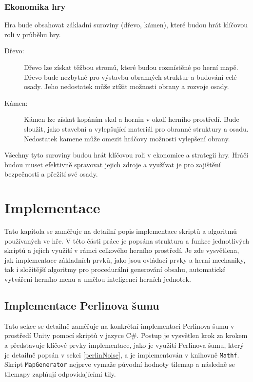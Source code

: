 \subsection{Ekonomika hry}
Hra bude obsahovat základní suroviny (dřevo, kámen), které budou hrát klíčovou roli v průběhu hry.

\begin{description}
	\item[Dřevo:] Dřevo lze získat těžbou stromů, které budou rozmístěné po herní mapě. Dřevo bude nezbytné pro výstavbu obranných struktur a budování celé osady. Jeho nedostatek může ztížit možnosti obrany a rozvoje osady.
	\item[Kámen:] Kámen lze získat kopáním skal a hornin v okolí herního prostředí. Bude sloužit, jako stavební a vylepšující materiál pro obranné struktury a osadu. Nedostatek kamene může omezit hráčovy možnosti vylepšení obrany.
\end{description}

Všechny tyto suroviny budou hrát klíčovou roli v ekonomice a strategii hry. Hráči budou muset efektivně spravovat jejich zdroje a využívat je pro zajištění bezpečnosti a přežití své osady.

\chapter{Implementace}
\label{implementace}
Tato kapitola se zaměřuje na detailní popis implementace skriptů a algoritmů používaných ve hře. V této části práce je popsána struktura a funkce jednotlivých skriptů a jejich využití v rámci celkového herního prostředí. Je zde vysvětlena, jak implementace základních prvků, jako jsou ovládací prvky a herní mechaniky, tak i složitější algoritmy pro procedurální generování obsahu, automatické vytváření herního menu a umělou inteligenci herních jednotek.

\section{Implementace Perlinova šumu}

Tato sekce se detailně zaměřuje na konkrétní implementaci Perlinova šumu v prostředí Unity pomocí skriptů v jazyce C\#. Postup je vysvětlen krok za krokem a představuje klíčové prvky implementace, jako je využití Perlinova šumu, který je detailně popsán v sekci \ref{perlinNoise}, a je implementován v knihovně \texttt{Mathf}. Skript \texttt{MapGenerator} nejprve vymaže původní hodnoty tilemap a následně se tilemapy zaplňují odpovídajícími tily.

